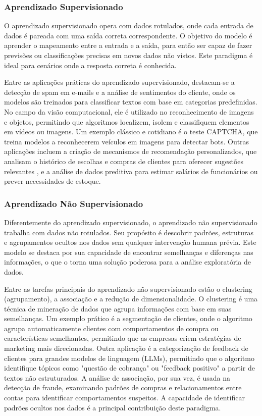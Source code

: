 \subsubsection{Aprendizado Supervisionado}

O aprendizado supervisionado opera com dados rotulados, onde cada entrada de dados é pareada com uma saída correta correspondente. O objetivo do modelo é aprender o mapeamento entre a entrada e a saída, para então ser capaz de fazer previsões ou classificações precisas em novos dados não vistos. Este paradigma é ideal para cenários onde a resposta correta é conhecida.

Entre as aplicações práticas do aprendizado supervisionado, destacam-se a detecção de spam em e-mails e a análise de sentimentos do cliente, onde os modelos são treinados para classificar textos com base em categorias predefinidas. No campo da visão computacional, ele é utilizado no reconhecimento de imagens e objetos, permitindo que algoritmos localizem, isolem e classifiquem elementos em vídeos ou imagens. Um exemplo clássico e cotidiano é o teste CAPTCHA, que treina modelos a reconhecerem veículos em imagens para detectar bots. Outras aplicações incluem a criação de mecanismos de recomendação personalizados, que analisam o histórico de escolhas e compras de clientes para oferecer sugestões relevantes , e a análise de dados preditiva para estimar salários de funcionários ou prever necessidades de estoque.

\subsubsection{Aprendizado Não Supervisionado}
Diferentemente do aprendizado supervisionado, o aprendizado não supervisionado trabalha com dados não rotulados. Seu propósito é descobrir padrões, estruturas e agrupamentos ocultos nos dados sem qualquer intervenção humana prévia. Este modelo se destaca por sua capacidade de encontrar semelhanças e diferenças nas informações, o que o torna uma solução poderosa para a análise exploratória de dados.

Entre as tarefas principais do aprendizado não supervisionado estão o clustering (agrupamento), a associação e a redução de dimensionalidade. O clustering é uma técnica de mineração de dados que agrupa informações com base em suas semelhanças. Um exemplo prático é a segmentação de clientes, onde o algoritmo agrupa automaticamente clientes com comportamentos de compra ou características semelhantes, permitindo que as empresas criem estratégias de marketing mais direcionadas. Outra aplicação é a categorização de feedback de clientes para grandes modelos de linguagem (LLMs), permitindo que o algoritmo identifique tópicos como "questão de cobrança" ou "feedback positivo" a partir de textos não estruturados. A análise de associação, por sua vez, é usada na detecção de fraude, examinando padrões de compras e relacionamentos entre contas para identificar comportamentos suspeitos. A capacidade de identificar padrões ocultos nos dados é a principal contribuição deste paradigma.

